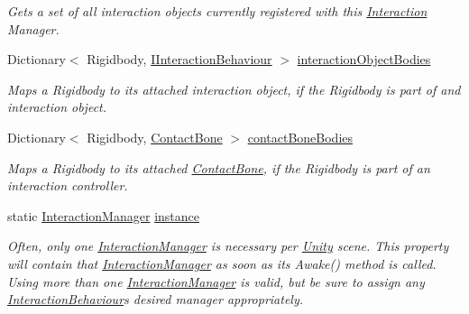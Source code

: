 \begin{DoxyCompactItemize}
\begin{DoxyCompactList}\small\item\em Gets a set of all interaction objects currently registered with this \mbox{\hyperlink{namespace_leap_1_1_unity_1_1_interaction}{Interaction}} Manager. \end{DoxyCompactList}\item 
Dictionary$<$ Rigidbody, \mbox{\hyperlink{interface_leap_1_1_unity_1_1_interaction_1_1_i_interaction_behaviour}{I\+Interaction\+Behaviour}} $>$ \mbox{\hyperlink{class_leap_1_1_unity_1_1_interaction_1_1_interaction_manager_a8db6ce75ed2fbf2fc032499f1e25d34c}{interaction\+Object\+Bodies}}
\begin{DoxyCompactList}\small\item\em Maps a Rigidbody to its attached interaction object, if the Rigidbody is part of and interaction object. \end{DoxyCompactList}\item 
Dictionary$<$ Rigidbody, \mbox{\hyperlink{class_leap_1_1_unity_1_1_interaction_1_1_contact_bone}{Contact\+Bone}} $>$ \mbox{\hyperlink{class_leap_1_1_unity_1_1_interaction_1_1_interaction_manager_a025e8a1a9e433fd86245a0e836deba86}{contact\+Bone\+Bodies}}
\begin{DoxyCompactList}\small\item\em Maps a Rigidbody to its attached \mbox{\hyperlink{class_leap_1_1_unity_1_1_interaction_1_1_contact_bone}{Contact\+Bone}}, if the Rigidbody is part of an interaction controller. \end{DoxyCompactList}\item 
static \mbox{\hyperlink{class_leap_1_1_unity_1_1_interaction_1_1_interaction_manager}{Interaction\+Manager}} \mbox{\hyperlink{class_leap_1_1_unity_1_1_interaction_1_1_interaction_manager_ad59361bc7c0cc65f18f0c9b9b0fac587}{instance}}
\begin{DoxyCompactList}\small\item\em Often, only one \mbox{\hyperlink{class_leap_1_1_unity_1_1_interaction_1_1_interaction_manager}{Interaction\+Manager}} is necessary per \mbox{\hyperlink{namespace_leap_1_1_unity}{Unity}} scene. This property will contain that \mbox{\hyperlink{class_leap_1_1_unity_1_1_interaction_1_1_interaction_manager}{Interaction\+Manager}} as soon as its Awake() method is called. Using more than one \mbox{\hyperlink{class_leap_1_1_unity_1_1_interaction_1_1_interaction_manager}{Interaction\+Manager}} is valid, but be sure to assign any \mbox{\hyperlink{class_leap_1_1_unity_1_1_interaction_1_1_interaction_behaviour}{Interaction\+Behaviour}}\textquotesingle{}s desired manager appropriately. \end{DoxyCompactList}\item 

\end{DoxyCompactItemize}
